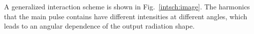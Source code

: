 A generalized interaction scheme is shown in Fig.~\ref{intsch:image}. The harmonics that the main pulse contains have different intensities at different angles, which leads to an angular dependence of the output radiation shape.



